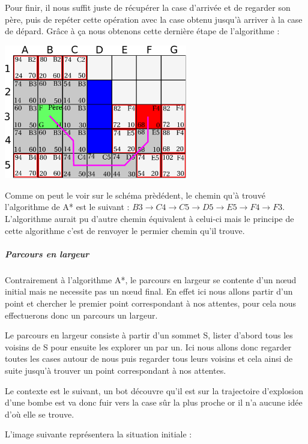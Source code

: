 			Pour finir, il nous suffit juste de récupérer la case d'arrivée et de regarder son père, puis de repéter cette opération avec la case obtenu jusqu'à arriver à la case de dépard. Grâce à ça nous obtenons cette dernière étape de l'algorithme :
			\begin{center}
				\includegraphics[width=8cm]{./Analyse/Img/Grille6.eps}
			\end{center}
		
			Comme on peut le voir sur le schéma prèdédent, le chemin qu'à trouvé l'algorithme de A* est le suivant : $ B3 \rightarrow C4 \rightarrow C5 \rightarrow D5 \rightarrow E5 \rightarrow F4 \rightarrow F3 $. L'algorithme aurait pu d'autre chemin équivalent à celui-ci mais le principe de cette algorithme c'est de renvoyer le permier chemin qu'il trouve.
		
		\subparagraph{Parcours en largeur\\}
		
			Contrairement à l'algorithme A*, le parcours en largeur se contente d'un
			nœud initial mais ne necessite pas un nœud final.
			En effet ici nous allons partir d'un point et chercher le premier point
			correspondant à nos attentes, pour cela nous effectuerons donc un parcours un
			largeur.
			
			
			Le parcours en largeur consiste à partir d'un sommet S, lister d'abord
			tous les voisins de S pour ensuite les explorer un par un.
			Ici nous allons donc regarder toutes les cases autour de nous puis regarder
			tous leurs voisins et cela ainsi de suite jusqu'à trouver un point
			correspondant à nos attentes.
			
			
			Le contexte est le suivant, un bot découvre qu'il est sur la trajectoire
			d'explosion d'une bombe est va donc fuir vers la case sûr la plus proche or
			il n'a aucune idée d'où elle se trouve.
			
			
			L'image suivante représentera la situation initiale :
			
